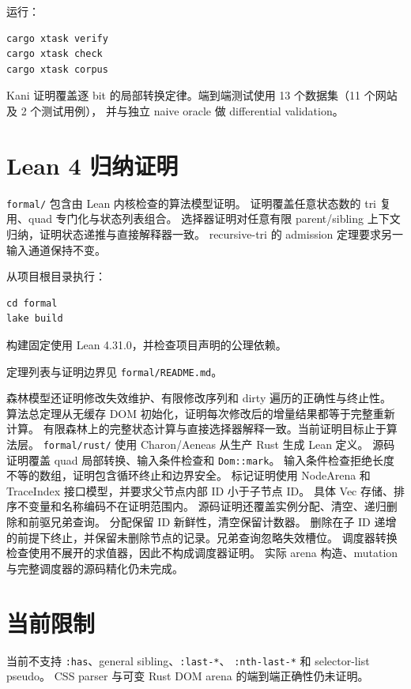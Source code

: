\documentclass[UTF8,11pt]{ctexart}
\begin{document}
运行：
\begin{verbatim}
cargo xtask verify
cargo xtask check
cargo xtask corpus
\end{verbatim}

Kani 证明覆盖逐 bit 的局部转换定律。端到端测试使用 13 个数据集（11 个网站及 2 个测试用例），
并与独立 naive oracle 做 differential validation。

\section{Lean 4 归纳证明}

\texttt{formal/} 包含由 Lean 内核检查的算法模型证明。
证明覆盖任意状态数的 tri 复用、quad 专门化与状态列表组合。
选择器证明对任意有限 parent/sibling 上下文归纳，证明状态递推与直接解释器一致。
recursive-tri 的 admission 定理要求另一输入通道保持不变。

从项目根目录执行：
\begin{verbatim}
cd formal
lake build
\end{verbatim}

构建固定使用 Lean 4.31.0，并检查项目声明的公理依赖。

定理列表与证明边界见 \nolinkurl{formal/README.md}。

森林模型还证明修改失效维护、有限修改序列和 dirty 遍历的正确性与终止性。
算法总定理从无缓存 DOM 初始化，证明每次修改后的增量结果都等于完整重新计算。
有限森林上的完整状态计算与直接选择器解释一致。当前证明目标止于算法层。
\texttt{formal/rust/} 使用 Charon/Aeneas 从生产 Rust 生成 Lean 定义。
源码证明覆盖 quad 局部转换、输入条件检查和 \texttt{Dom::mark}。
输入条件检查拒绝长度不等的数组，证明包含循环终止和边界安全。
标记证明使用 NodeArena 和 TraceIndex 接口模型，并要求父节点内部 ID 小于子节点 ID。
具体 Vec 存储、排序不变量和名称编码不在证明范围内。
源码证明还覆盖实例分配、清空、递归删除和前驱兄弟查询。
分配保留 ID 新鲜性，清空保留计数器。
删除在子 ID 递增的前提下终止，并保留未删除节点的记录。兄弟查询忽略失效槽位。
调度器转换检查使用不展开的求值器，因此不构成调度器证明。
实际 arena 构造、mutation 与完整调度器的源码精化仍未完成。

\section{当前限制}

当前不支持 \texttt{:has}、general sibling、\texttt{:last-*}、
\texttt{:nth-last-*} 和 selector-list pseudo。
CSS parser 与可变 Rust DOM arena 的端到端正确性仍未证明。
\end{document}
